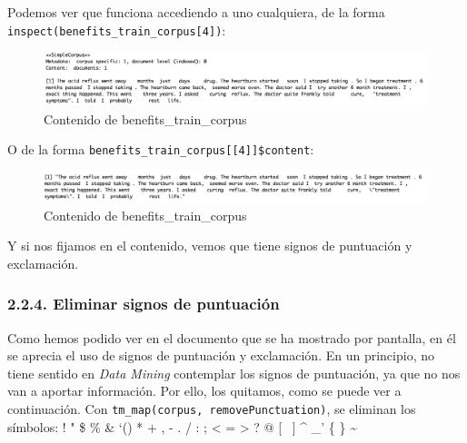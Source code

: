 \documentclass[spanish,]{article}
\begin{document}
Podemos ver que funciona accediendo a uno cualquiera, de la forma
\texttt{inspect(benefits\_train\_corpus{[}4{]})}:

\begin{figure}[h]
    \centering
    \includegraphics[width=1\textwidth]{imagenes/benefits_train_corpus1.png}
    \caption{Contenido de benefits\_train\_corpus}
    \label{benefits1}
\end{figure}

O de la forma \texttt{benefits\_train\_corpus{[}{[}4{]}{]}\$content}:

\begin{figure}[h]
    \centering
    \includegraphics[width=1\textwidth]{imagenes/benefits_train_corpus2.png}
    \caption{Contenido de benefits\_train\_corpus}
    \label{benefits2}
\end{figure}

Y si nos fijamos en el contenido, vemos que tiene signos de puntuación y
exclamación.

\subsubsection{2.2.4. Eliminar signos de
puntuación}\label{eliminar-signos-de-puntuacion}

Como hemos podido ver en el documento que se ha mostrado por pantalla,
en él se aprecia el uso de signos de puntuación y exclamación. En un
principio, no tiene sentido en \textit{Data Mining} contemplar los
signos de puntuación, ya que no nos van a aportar información. Por ello,
los quitamos, como se puede ver a continuación. Con
\texttt{tm\_map(corpus,\ removePunctuation)}, se eliminan los símbolos:
! " \$ \% \& `() * + , - . / : ; \textless{} = \textgreater{} ? @ {[}
~{]} \^{} \_' \{ \textbar{} \} \textasciitilde{}
\end{document}
